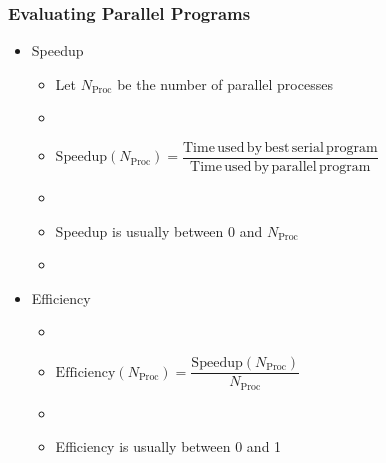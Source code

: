 \documentclass[10pt,t]{beamer}
\begin{document}
\begin{frame}
  \frametitle{Evaluating Parallel Programs}
  \begin{itemize}
  \item Speedup
    \begin{itemize}
    \item Let $N_{\mathrm{Proc}}$ be the number of parallel processes
    \item[] 
    \item $\mathrm{Speedup}(N_{\mathrm{Proc}}) = \dfrac{\mathrm{Time\,used\,by\,best\,serial\,program}}{\mathrm{Time\,used\,by\,parallel\,program}}$ 
    \item[]
    \item Speedup is usually between 0 and $N_{\mathrm{Proc}}$
    \item[] 
    \end{itemize}
  \item Efficiency
    \begin{itemize}
    \item[]
    \item $\mathrm{Efficiency}(N_{\mathrm{Proc}}) = \dfrac{\mathrm{Speedup}(N_{\mathrm{Proc}})}{N_{\mathrm{Proc}}}$
    \item[]
    \item Efficiency is usually between 0 and 1
    \end{itemize}
  \end{itemize}
\end{frame}
\end{document}
